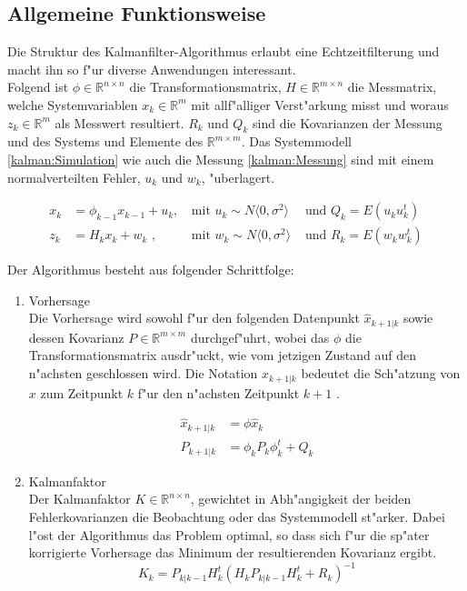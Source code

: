 \begin{refsection}
\subsection{Allgemeine Funktionsweise}

Die Struktur des Kalmanfilter-Algorithmus erlaubt eine Echtzeitfilterung und macht ihn so f"ur diverse Anwendungen interessant.\\
Folgend ist $\phi \in \mathbb{R}^{n\times n}$ die Transformationsmatrix, $H \in \mathbb{R}^{m\times n}$ die Messmatrix, welche Systemvariablen $x_{k}\in \mathbb{R}^{m}$ mit allf"alliger Verst"arkung misst und woraus $z_{k}\in \mathbb{R}^{m}$ als Messwert resultiert. $R_{k}$ und $Q_{k}$ sind die Kovarianzen der Messung und des Systems und Elemente des $\mathbb{R}^{m\times m}$. Das Systemmodell \eqref{kalman:Simulation} wie auch die Messung \eqref{kalman:Messung} sind mit einem normalverteilten Fehler, $u_{k}$ und $w_{k}$, "uberlagert\cite{skript:WRStat}.

\begin{align}
x_{k}&=\phi_{k-1}x_{k-1}+u_{k} \text{, } &\text{mit } u_{k}\sim N\langle0,\sigma^{2}\rangle &\text{ und } Q_{k}=E(u_{k}u^{t}_{k}) \label{kalman:Simulation}\\
z_{k}&=H_{k}x_{k}+w_{k} \text{ ,} &\text{mit } w_{k}\sim N\langle0,\sigma^{2}\rangle &\text{ und } R_{k}=E(w_{k}w^{t}_{k})
\label{kalman:Messung}
\end{align}


Der Algorithmus besteht aus folgender Schrittfolge:
\begin{enumerate}

\item Vorhersage\\
Die Vorhersage wird sowohl f"ur den folgenden Datenpunkt $\hat{x}_{k+1|k}$ sowie dessen Kovarianz $P \in \mathbb{R}^{m\times m}$ durchgef"uhrt, wobei das $\phi$ die Transformationsmatrix ausdr"uckt, wie vom jetzigen Zustand auf den n"achsten geschlossen wird. Die Notation $\hat{x}_{k+1|k}$ bedeutet die Sch"atzung von $x$ zum Zeitpunkt $k$ f"ur den n"achsten Zeitpunkt $k+1$ .

\begin{align*}
\hat{x}_{k+1|k} &= \phi\hat{x}_{k}\\
P_{k+1|k} &=\phi_{k}P_{k}\phi_{k}^{t}+Q_{k}
\end{align*}

\item Kalmanfaktor\\
Der Kalmanfaktor $K \in \mathbb{R}^{n\times n}$, gewichtet in Abh"angigkeit der beiden Fehlerkovarianzen die Beobachtung oder das Systemmodell st"arker. Dabei l"ost der Algorithmus das Problem optimal, so dass sich f"ur die sp"ater korrigierte Vorhersage das Minimum der resultierenden Kovarianz ergibt.\\
\[K_{k}=P_{k|k-1}H^{t}_{k}(H_{k}P_{k|k-1}H^{t}_{k}+R_{k})^{-1}   \]


\end{enumerate}
\end{refsection}
